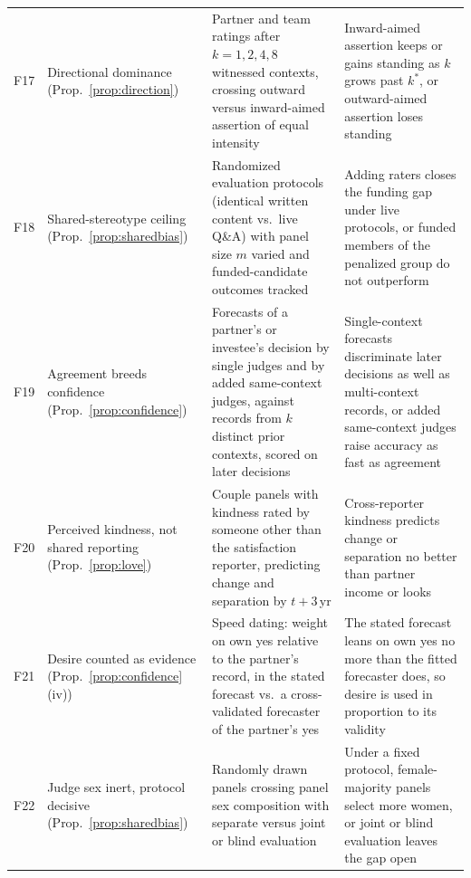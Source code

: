 \begin{table}[!t]
\begin{tabularx}{\textwidth}{@{}l>{\raggedright\arraybackslash}p{}LL@{}}
F17 & Directional dominance (Prop.~\ref{prop:direction}) & Partner and team ratings after $k=1,2,4,8$ witnessed contexts, crossing outward versus inward-aimed assertion of equal intensity & Inward-aimed assertion keeps or gains standing as $k$ grows past $k^*$, or outward-aimed assertion loses standing \\
F18 & Shared-stereotype ceiling (Prop.~\ref{prop:sharedbias}) & Randomized evaluation protocols (identical written content vs.\ live Q\&A) with panel size $m$ varied and funded-candidate outcomes tracked & Adding raters closes the funding gap under live protocols, or funded members of the penalized group do not outperform \\
F19 & Agreement breeds confidence (Prop.~\ref{prop:confidence}) & Forecasts of a partner's or investee's decision by single judges and by added same-context judges, against records from $k$ distinct prior contexts, scored on later decisions & Single-context forecasts discriminate later decisions as well as multi-context records, or added same-context judges raise accuracy as fast as agreement \\
F20 & Perceived kindness, not shared reporting (Prop.~\ref{prop:love}) & Couple panels with kindness rated by someone other than the satisfaction reporter, predicting change and separation by $t+3$\,yr & Cross-reporter kindness predicts change or separation no better than partner income or looks \\
F21 & Desire counted as evidence (Prop.~\ref{prop:confidence}(iv)) & Speed dating: weight on own yes relative to the partner's record, in the stated forecast vs.\ a cross-validated forecaster of the partner's yes & The stated forecast leans on own yes no more than the fitted forecaster does, so desire is used in proportion to its validity \\
F22 & Judge sex inert, protocol decisive (Prop.~\ref{prop:sharedbias}) & Randomly drawn panels crossing panel sex composition with separate versus joint or blind evaluation & Under a fixed protocol, female-majority panels select more women, or joint or blind evaluation leaves the gap open \\
\bottomrule
\end{tabularx}
\end{table}
\clearpage
